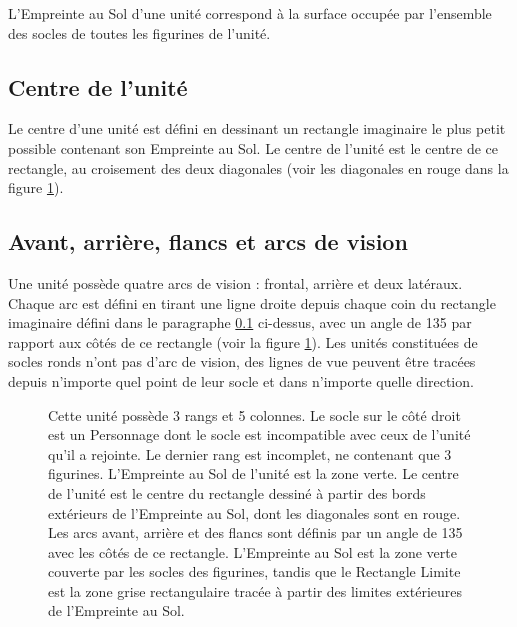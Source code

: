 L'Empreinte au Sol d'une unité correspond à la surface occupée par l'ensemble des socles de toutes les figurines de l'unité.

\subsection{Centre de l'unité}
\label{centre_unite}

Le centre d'une unité est défini en dessinant un rectangle imaginaire le plus petit possible contenant son Empreinte au Sol. Le centre de l'unité est le centre de ce rectangle, au croisement des deux diagonales (voir les diagonales en rouge dans la figure \ref{figure/arcs}).

\subsection{Avant, arrière, flancs et arcs de vision}

Une unité possède quatre arcs de vision : frontal, arrière et deux latéraux. Chaque arc est défini en tirant une ligne droite depuis chaque coin du rectangle imaginaire défini dans le paragraphe \ref{centre_unite} ci-dessus, avec un angle de 135{\text{\degree}} par rapport aux côtés de ce rectangle (voir la figure \ref{figure/arcs}). Les unités constituées de socles ronds n'ont pas d'arc de vision, des lignes de vue peuvent être tracées depuis n'importe quel point de leur socle et dans n'importe quelle direction.

\newcommand{\frontarc}{Arc frontal}
\newcommand{\leftsidearc}{Arc latéral}
\newcommand{\rightsidearc}{Arc latéral}
\newcommand{\reararc}{Arc arrière}
\newcommand{\centreofunit}{\normalfontsize Centre de l'unité}
\newcommand{\firstangle}{90 \text{\degree}}
\newcommand{\secondangle}{135 \text{\degree}}
\newcommand{\FIGfootprint}{Empreinte au Sol}
\newcommand{\FIGboundaryrectangle}{Rectangle Limite}

\begin{figure}[!htbp]
\centering
\def\svgwidth{14cm}

\caption{Cette unité possède 3 rangs et 5 colonnes. Le socle sur le côté droit est un Personnage dont le socle est incompatible avec ceux de l'unité qu'il a rejointe. Le dernier rang est incomplet, ne contenant que 3 figurines. L'Empreinte au Sol de l'unité est la zone verte. Le centre de l'unité est le centre du rectangle dessiné à partir des bords extérieurs de l'Empreinte au Sol, dont les diagonales sont en rouge. Les arcs avant, arrière et des flancs sont définis par un angle de 135{\text{\degree}} avec les côtés de ce rectangle.\vspace*{10pt}\newline
L'Empreinte au Sol est la zone verte couverte par les socles des figurines, tandis que le Rectangle Limite est la zone grise rectangulaire tracée à partir des limites extérieures de l'Empreinte au Sol.
}
\label{figure/arcs}
\end{figure}

